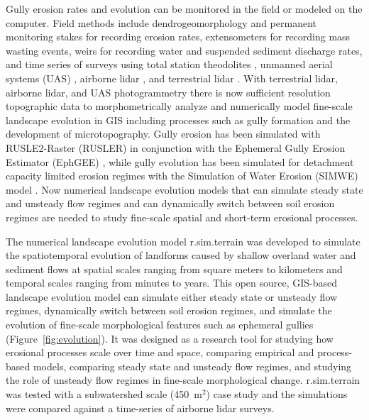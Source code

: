 \documentclass[gmd, manuscript]{copernicus}
\begin{document}
Gully erosion rates and evolution
can be monitored in the field 
or modeled on the computer. 
Field methods include
dendrogeomorphology \citep{Malik2008} and 
permanent monitoring stakes for recording erosion rates, 
extensometers for recording mass wasting events, 
weirs for recording water and suspended sediment discharge rates, 
and time series of surveys using 
total station theodolites \citep{Thomas2004},
unmanned aerial systems (UAS) \citep{Jeziorska2016,Kasprak2019,Yang2019},
airborne lidar \citep{Perroy2010,Starek2011}, 
and terrestrial lidar \citep{Starek2011,Bechet2016,Goodwin2016,Telling2017}.
With terrestrial lidar, airborne lidar, and 
UAS photogrammetry
there is now sufficient resolution topographic data 
to morphometrically analyze and 
numerically model fine-scale landscape evolution in GIS
including processes such as gully formation 
and the development of microtopography. 
Gully erosion has been simulated with 
RUSLE2-Raster (RUSLER)
in conjunction with the Ephemeral Gully Erosion Estimator (EphGEE)
\citep{Dabney2014},
while gully evolution
has been simulated for detachment capacity limited erosion regimes
with the Simulation of Water Erosion (SIMWE) model
\citep{Koco2011, Mitasova2013}. 
Now numerical landscape evolution models 
that can simulate 
steady state and unsteady flow regimes
and can dynamically switch between soil erosion regimes 
are needed to study 
fine-scale spatial and short-term erosional processes.

The numerical landscape evolution model 
r.sim.terrain was developed to 
simulate the spatiotemporal evolution of landforms
caused by shallow overland water and sediment flows
at spatial scales ranging from
square meters to kilometers
and temporal scales ranging from minutes to years. 
This open source, GIS-based landscape evolution model can
simulate either steady state or unsteady flow regimes,
dynamically switch between soil erosion regimes, and
simulate the evolution of fine-scale morphological features 
such as ephemeral gullies
(Figure~\ref{fig:evolution}).
It was designed as a research tool for
studying how erosional processes scale over time and space,
comparing empirical and process-based models, 
comparing steady state and unsteady flow regimes, and
studying the role of unsteady flow regimes
in fine-scale morphological change. 
r.sim.terrain was tested with 
a subwatershed scale (450~\unit{m}$^{2}$) case study
and the simulations were compared against 
a time-series of airborne lidar surveys.
\end{document}
